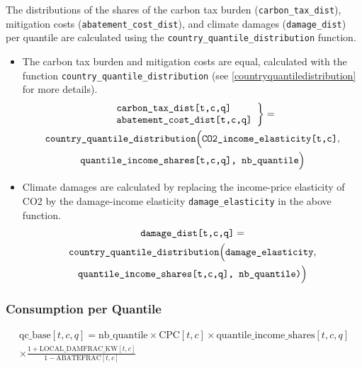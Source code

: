\documentclass[
]{article}
\providecommand{\tightlist}{%
  \setlength{\itemsep}{0pt}\setlength{\parskip}{0pt}}
\begin{document}
The distributions of the shares of the carbon tax burden
(\texttt{carbon\_tax\_dist}), mitigation costs
(\texttt{abatement\_cost\_dist}), and climate damages
(\texttt{damage\_dist}) per quantile are calculated using the
\texttt{country\_quantile\_distribution} function.

\begin{itemize}
\tightlist
\item 
The carbon tax burden and mitigation costs are equal, calculated with the function \texttt{country\_quantile\_distribution} (see \ref{countryquantiledistribution} for more details).
\begin{multline}
  \left. \begin{array}{l}
  \texttt{carbon\_tax\_dist{[}t,c,q{]}} \\
  \texttt{abatement\_cost\_dist{[}t,c,q{]}}
  \end{array} \right\}
  = \\
  \texttt{country\_quantile\_distribution} \Bigl( \texttt{CO2\_income\_elasticity{[}t,c{]}},\\
  \texttt{quantile\_income\_shares{[}t,c,q{]},\ nb\_quantile} \Bigr)
  \end{multline}

\item Climate damages are calculated by replacing the income-price elasticity of CO2 by the damage-income elasticity
  \texttt{damage\_elasticity} in the above function.
\begin{multline}
  \texttt{damage\_dist{[}t,c,q{]}} = \\
  \texttt{country\_quantile\_distribution} \Bigl( \texttt{damage\_elasticity},\\
  \texttt{quantile\_income\_shares{[}t,c,q{]},\ nb\_quantile)} \Bigr)
\end{multline}

\end{itemize}

\subsubsection{Consumption per Quantile}\label{consumption-per-quantile}

\begin{multline}
  \text{qc\_base}[t,c,q] = \text{nb\_quantile} \times \text{CPC}[t,c] \times \text{quantile\_income\_shares}[t,c,q]  \\
 \times \frac{1 + \text{LOCAL\_DAMFRAC\_KW}[t,c]}{1 - \text{ABATEFRAC}[t,c]} 
\end{multline}
\end{document}
